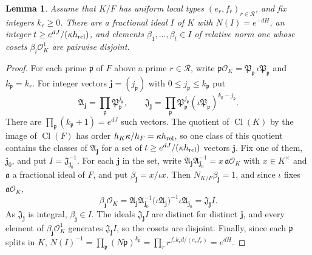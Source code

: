 \documentclass[11pt]{amsart}
\numberwithin{equation}{section}
\newtheorem{lemma}[equation]{Lemma}
\theoremstyle{definition}
\theoremstyle{remark}
\DeclareMathOperator{\Cl}{Cl}
\begin{document}
\begin{lemma}\label{geo:selection}
Assume that $K/F$ has uniform local types $(e_r,f_r)_{r\in\mathcal R}$, and
fix integers $k_r\ge0$. There are a
fractional ideal $I$ of $K$ with $N(I)=e^{-dH}$, an integer
$t\ge e^{dJ}/(\kappa h_{\rm rel})$, and elements
$\beta_1,\dots,\beta_t\in I$ of relative norm one whose cosets
$\beta_i\mathcal O_K^1$ are pairwise disjoint.
\end{lemma}

\begin{proof}
For each prime $\mathfrak p$ of $F$ above a prime $r\in\mathcal R$, write
$\mathfrak p\mathcal O_K=\mathfrak P_{\mathfrak p}\,\iota\mathfrak
P_{\mathfrak p}$ and $k_{\mathfrak p}=k_r$. For integer vectors
$\boldsymbol j=(j_{\mathfrak p})$ with $0\le j_{\mathfrak p}\le
k_{\mathfrak p}$ put
\[
 \mathfrak A_{\boldsymbol j}=\prod_{\mathfrak p}
 \mathfrak P_{\mathfrak p}^{j_{\mathfrak p}},\qquad
 \mathfrak J_{\boldsymbol j}=\prod_{\mathfrak p}
 \mathfrak P_{\mathfrak p}^{j_{\mathfrak p}}
 (\iota\mathfrak P_{\mathfrak p})^{k_{\mathfrak p}-j_{\mathfrak p}}.
\]
There are $\prod_{\mathfrak p}(k_{\mathfrak p}+1)=e^{dJ}$ such vectors.
The quotient of $\Cl(K)$ by the image of $\Cl(F)$ has order
$h_K\kappa/h_F=\kappa h_{\rm rel}$, so one class of this quotient
contains the classes of $\mathfrak A_{\boldsymbol j}$ for a set of
$t\ge e^{dJ}/(\kappa h_{\rm rel})$ vectors $\boldsymbol j$. Fix one of
them, $\boldsymbol j_0$, and put $I=\mathfrak J_{\boldsymbol j_0}^{-1}$.
For each $\boldsymbol j$ in the set, write
$\mathfrak A_{\boldsymbol j}\mathfrak A_{\boldsymbol j_0}^{-1}
=x\,\mathfrak a\mathcal O_K$ with $x\in K^\times$ and $\mathfrak a$ a
fractional ideal of $F$, and put $\beta_{\boldsymbol j}=x/\iota x$.
Then $N_{K/F}\beta_{\boldsymbol j}=1$, and since $\iota$ fixes
$\mathfrak a\mathcal O_K$,
\[
 \beta_{\boldsymbol j}\mathcal O_K
 =\mathfrak A_{\boldsymbol j}\mathfrak A_{\boldsymbol j_0}^{-1}
 \bigl(\iota\mathfrak A_{\boldsymbol j}\bigr)^{-1}
 \iota\mathfrak A_{\boldsymbol j_0}
 =\mathfrak J_{\boldsymbol j}I.
\]
As $\mathfrak J_{\boldsymbol j}$ is integral,
$\beta_{\boldsymbol j}\in I$. The ideals $\mathfrak J_{\boldsymbol j}I$
are distinct for distinct $\boldsymbol j$, and every element of
$\beta_{\boldsymbol j}\mathcal O_K^1$ generates
$\mathfrak J_{\boldsymbol j}I$, so the cosets are disjoint. Finally,
since each $\mathfrak p$ splits in $K$,
$N(I)^{-1}=\prod_{\mathfrak p}(N\mathfrak p)^{k_{\mathfrak p}}
=\prod_r r^{f_rk_rd/(e_rf_r)}=e^{dH}$.
\end{proof}
\end{document}
